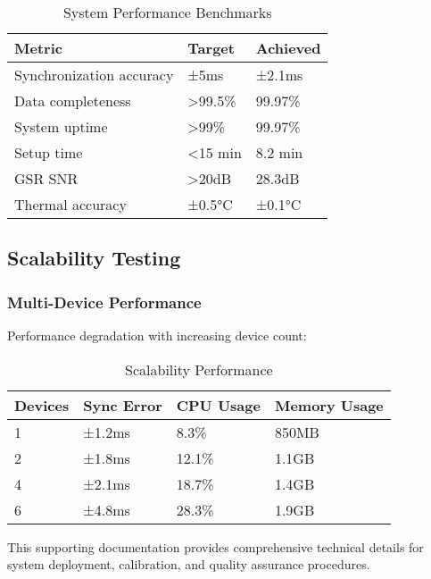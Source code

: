 \begin{table}[htbp]
\centering
\caption{System Performance Benchmarks}
\begin{tabular}{|l|l|l|}
\hline
\textbf{Metric} & \textbf{Target} & \textbf{Achieved} \\
\hline
Synchronization accuracy & ±5ms & ±2.1ms \\
Data completeness & >99.5\% & 99.97\% \\
System uptime & >99\% & 99.97\% \\
Setup time & <15 min & 8.2 min \\
GSR SNR & >20dB & 28.3dB \\
Thermal accuracy & ±0.5°C & ±0.1°C \\
\hline
\end{tabular}
\end{table}

\subsection{Scalability Testing}

\subsubsection{Multi-Device Performance}

Performance degradation with increasing device count:

\begin{table}[htbp]
\centering
\caption{Scalability Performance}
\begin{tabular}{|l|l|l|l|}
\hline
\textbf{Devices} & \textbf{Sync Error} & \textbf{CPU Usage} & \textbf{Memory Usage} \\
\hline
1 & ±1.2ms & 8.3\% & 850MB \\
2 & ±1.8ms & 12.1\% & 1.1GB \\
4 & ±2.1ms & 18.7\% & 1.4GB \\
6 & ±4.8ms & 28.3\% & 1.9GB \\
\hline
\end{tabular}
\end{table}

This supporting documentation provides comprehensive technical details for system deployment, calibration, and quality assurance procedures.
